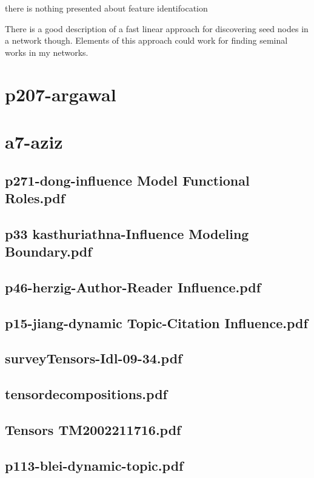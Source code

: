 \documentclass{article}
\begin{document}
there is nothing presented about feature identifocation

There is a good description of a fast linear
approach for discovering seed nodes in a network
though.  Elements of this approach could work
for finding seminal works in my networks.

\section{p207-argawal}

\section{a7-aziz}

\subsection{p271-dong-influence Model Functional Roles.pdf}

\subsection{p33 kasthuriathna-Influence Modeling Boundary.pdf}

\subsection{p46-herzig-Author-Reader Influence.pdf}

\subsection{p15-jiang-dynamic Topic-Citation Influence.pdf}

\subsection{surveyTensors-Idl-09-34.pdf}

\subsection{tensordecompositions.pdf}

\subsection{Tensors TM2002211716.pdf}

\subsection{p113-blei-dynamic-topic.pdf}
\end{document}

